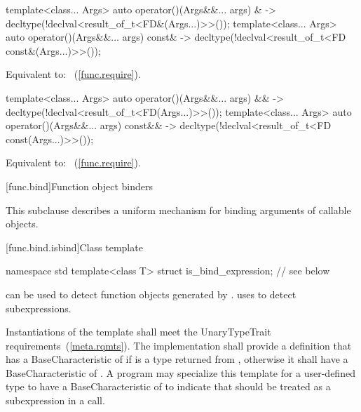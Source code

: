 \begin{itemdecl}
template<class... Args>
  auto operator()(Args&&... args) &
    -> decltype(!declval<result_of_t<FD&(Args...)>>());
template<class... Args>
  auto operator()(Args&&... args) const&
    -> decltype(!declval<result_of_t<FD const&(Args...)>>());
\end{itemdecl}

\begin{itemdescr}
\pnum
\effects
Equivalent to:
~(\ref{func.require}).
\end{itemdescr}

\begin{itemdecl}
template<class... Args>
  auto operator()(Args&&... args) &&
    -> decltype(!declval<result_of_t<FD(Args...)>>());
template<class... Args>
  auto operator()(Args&&... args) const&&
    -> decltype(!declval<result_of_t<FD const(Args...)>>());
\end{itemdecl}

\begin{itemdescr}
\pnum
\effects
Equivalent to:
~(\ref{func.require}).
\end{itemdescr}

[func.bind]{Function object binders}%

\pnum
This subclause describes a uniform mechanism for binding
arguments of callable objects.

[func.bind.isbind]{Class template }

%
\begin{codeblock}
namespace std {
  template<class T> struct is_bind_expression; // see below
}
\end{codeblock}

\pnum
{} can be used to detect function objects
generated by . 
uses  to detect subexpressions.

\pnum
Instantiations of the  template shall meet
the UnaryTypeTrait requirements~(\ref{meta.rqmts}). The implementation
shall provide a definition that has a BaseCharacteristic of
 if  is a type returned from ,
otherwise it shall have a BaseCharacteristic of .
A program may specialize this template for a user-defined type 
to have a BaseCharacteristic of  to indicate that
 should be treated as a subexpression in a  call.

